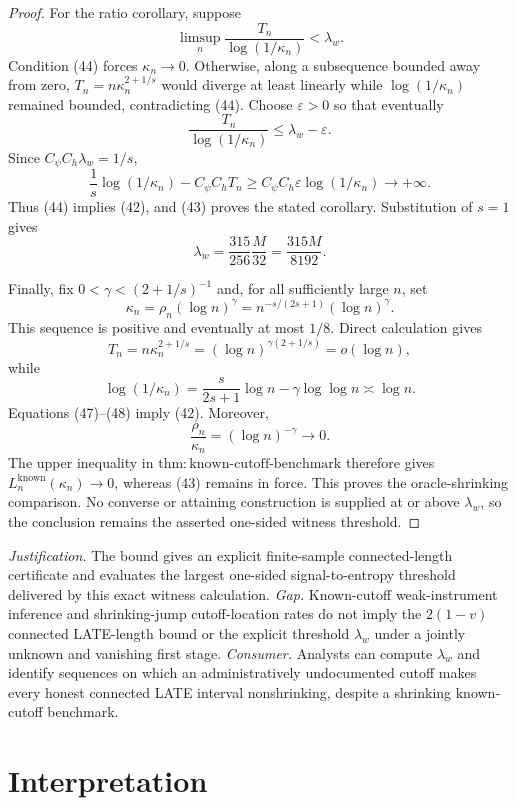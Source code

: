 \documentclass{article}
\begin{document}
\begin{proof}
For the ratio corollary, suppose
\[
\limsup_n\frac{T_n}{\log(1/\kappa_n)}<\lambda_w.
\tag{44}
\]
Condition (44) forces \(\kappa_n\to0\).  Otherwise, along a subsequence bounded away from zero, \(T_n=n\kappa_n^{2+1/s}\) would diverge at least linearly while \(\log(1/\kappa_n)\) remained bounded, contradicting (44).  Choose \(\varepsilon>0\) so that eventually
\[
\frac{T_n}{\log(1/\kappa_n)}\le\lambda_w-\varepsilon.
\]
Since \(C_\psi C_h\lambda_w=1/s\),
\[
\frac1s\log(1/\kappa_n)-C_\psi C_hT_n
\ge C_\psi C_h\varepsilon\log(1/\kappa_n)
\longrightarrow+\infty.
\tag{45}
\]
Thus (44) implies (42), and (43) proves the stated corollary.  Substitution of \(s=1\) gives
\[
\lambda_w=\frac{315}{256}\frac{M}{32}=\frac{315M}{8192}.
\]

Finally, fix \(0<\gamma<(2+1/s)^{-1}\) and, for all sufficiently large \(n\), set
\[
\kappa_n=\rho_n(\log n)^\gamma
=n^{-s/(2s+1)}(\log n)^\gamma.
\tag{46}
\]
This sequence is positive and eventually at most \(1/8\).  Direct calculation gives
\[
T_n=n\kappa_n^{2+1/s}
=(\log n)^{\gamma(2+1/s)}=o(\log n),
\tag{47}
\]
while
\[
\log(1/\kappa_n)
=\frac{s}{2s+1}\log n-\gamma\log\log n
\asymp\log n.
\tag{48}
\]
Equations (47)--(48) imply (42).  Moreover,
\[
\frac{\rho_n}{\kappa_n}=(\log n)^{-\gamma}\longrightarrow0.
\]
The upper inequality in \(\mathrm{thm:known\mbox{-}cutoff\mbox{-}benchmark}\) therefore gives \(L_n^{\mathrm{known}}(\kappa_n)\to0\), whereas (43) remains in force.  This proves the oracle-shrinking comparison.  No converse or attaining construction is supplied at or above \(\lambda_w\), so the conclusion remains the asserted one-sided witness threshold.
\end{proof}
\par\smallskip\noindent \textit{Justification.} The bound gives an explicit finite-sample connected-length certificate and evaluates the largest one-sided signal-to-entropy threshold delivered by this exact witness calculation. \textit{Gap.} Known-cutoff weak-instrument inference and shrinking-jump cutoff-location rates do not imply the \(2(1-v)\) connected LATE-length bound or the explicit threshold \(\lambda_w\) under a jointly unknown and vanishing first stage. \textit{Consumer.} Analysts can compute \(\lambda_w\) and identify sequences on which an administratively undocumented cutoff makes every honest connected LATE interval nonshrinking, despite a shrinking known-cutoff benchmark.

\section{Interpretation}
\end{document}
